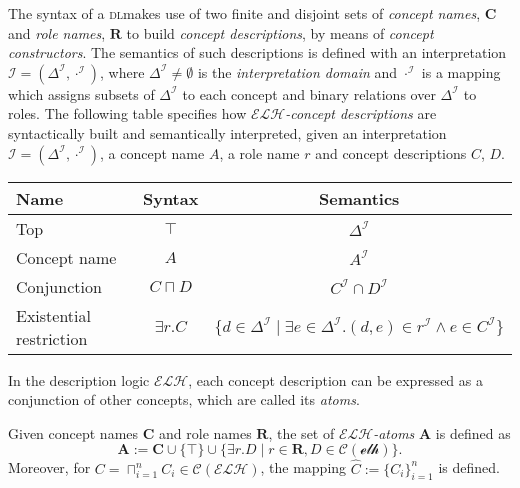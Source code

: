 \documentclass[]{llncs}
\newcommand{\elh}{\(\mathcal{ELH}{}\)}
\newcommand{\DeltaI}{\Delta^\mathcal{I}}
\newcommand{\dotI}{\cdot^{\mathcal{I}}}
\newcommand{\dl}{\textsc{dl}}
\begin{document}
  The syntax of a \dl makes use of two finite and disjoint sets of \emph{concept names}, \(\mathbf{C}\) and \emph{role names}, \(\mathbf{R}\) to build \emph{concept descriptions}, by means of \emph{concept constructors}.
  The semantics of such descriptions is defined with an interpretation \(\mathcal{I} = (\DeltaI,\dotI)\), where \(\DeltaI \ne \emptyset\) is the \emph{interpretation domain} and \(\dotI\) is a mapping which assigns subsets of \(\DeltaI{}\) to each concept and binary relations over \(\DeltaI\) to roles.
  The following table specifies how \emph{\elh-concept descriptions} are syntactically built and semantically interpreted, given an interpretation \(\mathcal{I} = (\DeltaI,\dotI)\), a concept name \(A\), a role name \(r\) and concept descriptions \(C\), \(D\).
  \begin{center}
    \begin{tabular}{lcc}
      \toprule
      Name & Syntax & Semantics \\
      \midrule
      Top & \(\top\) & \(\DeltaI\) \\
      Concept name & \(A\) & \(A^\mathcal{I}\) \\
      Conjunction & \(C \sqcap D\) & \(C^\mathcal{I} \cap D^\mathcal{I}\) \\
      Existential restriction & \(\exists{}r.C\) &
      \(\lbrace d \in \DeltaI \mid \exists e \in \DeltaI.
      (d,e) \in r^\mathcal{I} \land e \in C^\mathcal{I} \rbrace\) \\
      \bottomrule
    \end{tabular}
  \end{center}

  In the description logic \elh{}, each concept description can be expressed as a conjunction of other concepts, which are called its \emph{atoms}.
  \begin{definition}[Atoms]
    Given concept names \(\mathbf{C}\) and role names \(\mathbf{R}\), the set of \emph{\elh-atoms} \(\mathbf{A}\) is defined as
    \begin{equation}
      \mathbf{A} := \mathbf{C} \cup \lbrace \top \rbrace \cup \lbrace \exists{}r.D \mid r \in \mathbf{R}, D \in \mathcal{C}(\mathcal{elh}) \rbrace.
    \end{equation}
    Moreover, for \(C = \sqcap_{i=1}^n C_i \in \mathcal{C}(\mathcal{ELH})\), the mapping
    \(\widehat{C} := \lbrace C_i\rbrace_{i=1}^n\) is defined.
  \end{definition}
\end{document}
